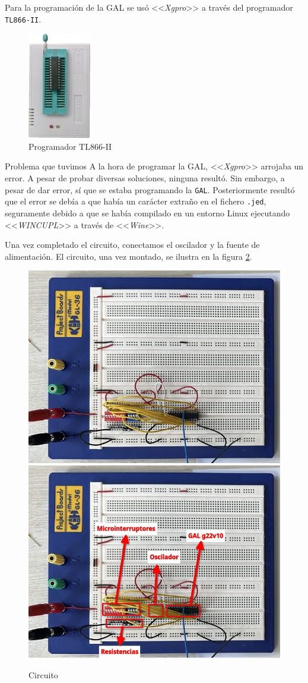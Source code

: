 Para la programación de la GAL se usó <<\textit{Xgpro}>> a través del programador \texttt{TL866-II}.

\begin{figure}[!htb]
    \centering
    \includegraphics[width=0.14\linewidth]{include/figures/Programador.jpg}
    \caption{Programador TL866-II}
    \label{Programador}
\end{figure}

\begin{cuidado}{Problema que tuvimos}
A la hora de programar la GAL, <<\textit{Xgpro}>> arrojaba un error. A pesar de probar diversas soluciones, ninguna resultó. Sin embargo, a pesar de dar error, sí que se estaba programando la \texttt{GAL}. Posteriormente resultó que el error se debía a que había un carácter extraño en el fichero \texttt{.jed}, seguramente debido a que se había compilado en un entorno Linux ejecutando <<\textit{WINCUPL}>> a través de <<\textit{Wine}>>.
\end{cuidado}


Una vez completado el circuito, conectamos el oscilador y la fuente de alimentación. El circuito, una vez montado, se ilustra en la figura \ref{fig:circuito}.

\begin{figure}[!htb]
    \centering
    \includegraphics[width=0.45\linewidth]{include/figures/Circuito.jpg}
    \includegraphics[width=0.45\linewidth]{include/figures/circuito-anotado.jpg}
    \caption{Circuito}
    \label{fig:circuito}
\end{figure}


